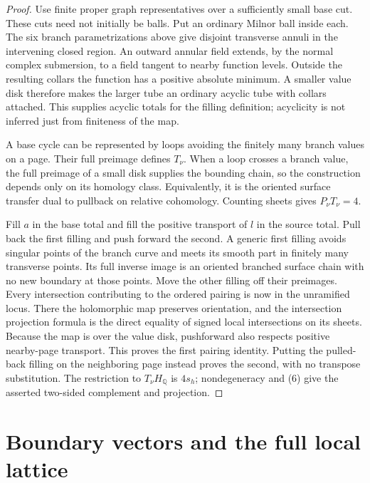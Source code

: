 \documentclass[11pt]{article}
\newcommand{\Q}{\mathbb Q}
\begin{document}
\begin{proof}
Use finite proper graph representatives over a sufficiently small
base cut. These cuts need not initially be balls. Put an ordinary
Milnor ball inside each. The six branch parametrizations above
give disjoint transverse annuli in the intervening closed region.
An outward annular field extends, by the normal complex
submersion, to a field tangent to nearby function levels.
Outside the resulting collars the function has a positive absolute
minimum. A smaller value disk therefore makes the larger tube an
ordinary acyclic tube with collars attached. This supplies acyclic
totals for the filling definition; acyclicity is not inferred just
from finiteness of the map.

A base cycle can be represented by loops avoiding the finitely
many branch values on a page. Their full preimage defines \(T_\nu\).
When a loop crosses a branch value, the full preimage of a small
disk supplies the bounding chain, so the construction depends only
on its homology class. Equivalently, it is the oriented surface
transfer dual to pullback on relative cohomology. Counting sheets
gives \(P_\nu T_\nu=4\).

Fill \(a\) in the base total and fill the positive transport of \(l\)
in the source total. Pull back the first filling and push forward
the second. A generic first filling avoids singular points of the
branch curve and meets its smooth part in finitely many transverse
points. Its full inverse image is an oriented branched surface
chain with no new boundary at those points. Move the other filling
off their preimages. Every intersection contributing to the ordered
pairing is now in the unramified locus. There the holomorphic map
preserves orientation, and the intersection projection formula is
the direct equality of signed local intersections on its sheets.
Because the map is over the value disk, pushforward also respects
positive nearby-page transport. This proves the first pairing
identity. Putting the pulled-back filling on the neighboring page
instead proves the second, with no transpose substitution.
The restriction to \(T_\nu H_\Q\) is \(4s_h\); nondegeneracy and
(6) give the asserted two-sided complement and projection.
\end{proof}

\section{Boundary vectors and the full local lattice}
\end{document}
